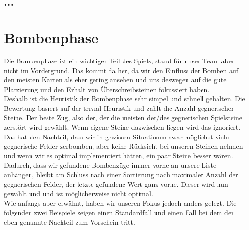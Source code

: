 \documentclass[12pt,a4paper,bibliography=totocnumbered,listof=totocnumbered]{scrartcl}
\begin{document}
    \subsection{...}
    \vspace{1em}


    \newpage
    \section{Bombenphase}
    \vspace{1em}
    
    Die Bombenphase ist ein wichtiger Teil des Spiels, stand für unser Team aber nicht im Vordergrund. Das kommt da her, da wir den Einfluss der Bomben auf den meisten Karten als eher gering ansehen und uns deswegen auf die gute Platzierung und den Erhalt von Überschreibsteinen fokussiert haben.\\
    Deshalb ist die Heuristik der Bombenphase sehr simpel und schnell gehalten. Die Bewertung basiert auf der trivial Heuristik und zählt die Anzahl gegnerischer Steine. Der beste Zug, also der, der die meisten der/des gegnerischen Spielsteine zerstört wird gewählt. Wenn eigene Steine dazwischen liegen wird das ignoriert. Das hat den Nachteil, dass wir in gewissen Situationen zwar möglichst viele gegnerische Felder zerbomben, aber keine Rücksicht bei unseren Steinen nehmen und wenn wir es optimal implementiert hätten, ein paar Steine besser wären. Dadurch, dass wir gefundene Bombenzüge immer vorne an unsere Liste anhängen, bleibt am Schluss nach einer Sortierung nach maximaler Anzahl der gegnerischen Felder, der letzte gefundene Wert ganz vorne. Dieser wird nun gewählt und und ist möglicherweise nicht optimal.\\
    Wie anfangs aber erwähnt, haben wir unseren Fokus jedoch anders gelegt. Die folgenden zwei Beispiele zeigen einen \glqq Standardfall\grqq{} und einen Fall bei dem der eben genannte Nachteil zum Vorschein tritt.
\end{document}
